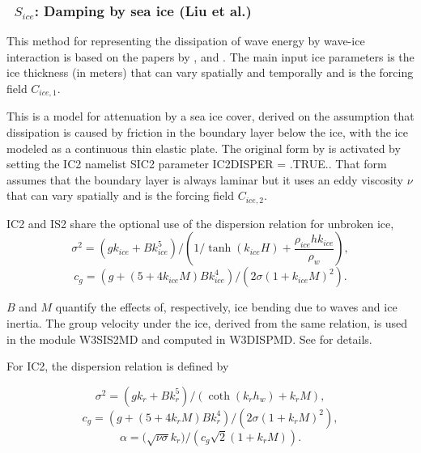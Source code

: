 \vsssub
\subsubsection{~$S_{ice}$: Damping by sea ice (Liu et al.)} \label{sec:ICE2}
\vsssub


\noindent
This method for representing the dissipation of wave energy by wave-ice interaction is based on the papers
by \cite{art:LMC88}, \cite{art:LHV91} and \cite{art:Aea15}. The main input ice parameters
is the ice thickness (in meters) that can vary spatially and temporally and is the forcing field  ${C_{ice,1}}$. 

This is a model for attenuation by a
sea ice cover, derived on the assumption that dissipation is caused by
friction in the boundary layer below the ice,
with the ice modeled as a continuous thin elastic plate. The original form by  \cite{art:LMC88} is activated by 
setting the {\code IC2} namelist {\F SIC2} parameter {\code IC2DISPER = .TRUE.}. That form 
 assumes that the boundary layer is always laminar but it uses an eddy viscosity ${\nu}$ that can vary spatially 
and is the forcing field ${C_{ice,2}}$. 

 {\code IC2} and {\code IS2} share 
the optional use of the \cite{art:LMC88} dispersion relation for unbroken ice, 
\begin{equation}
\sigma^2 =  \left(gk_{ice} + B k_{ice}^5\right)  / \left(1/\tanh ( k_{ice}H) +\frac{\rho_{ice}  h k_{ice}} {\rho_{w} }\right),
\end{equation}
\begin{equation}
c_g =  (g+(5 + 4 k_{ice} M)Bk_{ice}^4)/(2\sigma(1+k_{ice}M)^2).
\end{equation}

\noindent
$B$ and $M$ quantify the effects of, respectively, ice bending due to waves and ice inertia. 
The group velocity under the ice, derived from the same relation, is used in the module {\code W3SIS2MD} and computed in  
{\code W3DISPMD}.  See \citet{art:LMC88} for details.

For {\code IC2}, the dispersion relation is defined by 

\begin{equation}\label{eq:ice1}
  {\sigma}^2 = ({gk_r} + {Bk_r^5})/(\coth({k_r}{h_w}) + {k_r}{M}),
\end{equation}
\begin{equation}\label{eq:ice2}
  {c_g} = (g + (5 + 4{k_r}{M}){B}{k_r^4})/(2{\sigma}(1+{k_r}{M})^2),
\end{equation}
\begin{equation}\label{eq:ice3}
  {\alpha} = (\sqrt{{\nu\sigma}}{k_r)}/({c_g}\sqrt{2}(1+{k_r}{M})).
\end{equation}

